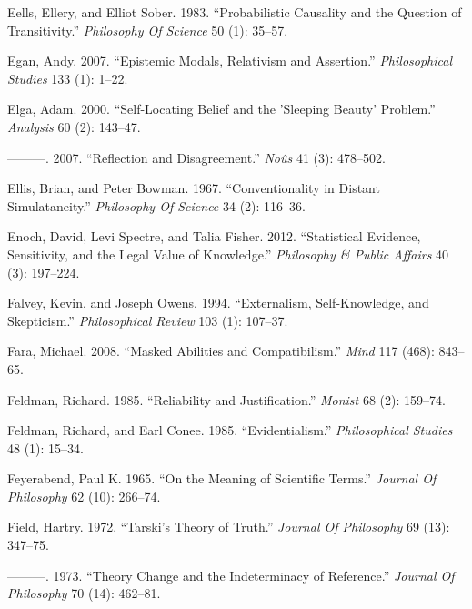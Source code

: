\documentclass[
  10pt,
  letterpaper,
  DIV=11,
  numbers=noendperiod,
  twoside]{scrartcl}
\newlength{\cslhangindent}
\newenvironment{CSLReferences}[2] %
 {\begin{list}{}{%
  \setlength{\itemindent}{0pt}
  \setlength{\leftmargin}{0pt}
  \setlength{\parsep}{0pt}
  \ifodd #1
   \setlength{\leftmargin}{\cslhangindent}
   \setlength{\itemindent}{-1\cslhangindent}
  \fi
  \setlength{\itemsep}{#2\baselineskip}}}
 {\end{list}}
\begin{document}
\begin{CSLReferences}{1}{0}
Eells, Ellery, and Elliot Sober. 1983. {``Probabilistic Causality and
the Question of Transitivity.''} \emph{Philosophy Of Science} 50 (1):
35--57.

Egan, Andy. 2007. {``Epistemic Modals, Relativism and Assertion.''}
\emph{Philosophical Studies} 133 (1): 1--22.

Elga, Adam. 2000. {``Self-Locating Belief and the 'Sleeping Beauty'
Problem.''} \emph{Analysis} 60 (2): 143--47.

---------. 2007. {``Reflection and Disagreement.''} \emph{Noûs} 41 (3):
478--502.

Ellis, Brian, and Peter Bowman. 1967. {``Conventionality in Distant
Simulataneity.''} \emph{Philosophy Of Science} 34 (2): 116--36.

Enoch, David, Levi Spectre, and Talia Fisher. 2012. {``Statistical
Evidence, Sensitivity, and the Legal Value of Knowledge.''}
\emph{Philosophy \& Public Affairs} 40 (3): 197--224.

Falvey, Kevin, and Joseph Owens. 1994. {``Externalism, Self-Knowledge,
and Skepticism.''} \emph{Philosophical Review} 103 (1): 107--37.

Fara, Michael. 2008. {``Masked Abilities and Compatibilism.''}
\emph{Mind} 117 (468): 843--65.

Feldman, Richard. 1985. {``Reliability and Justification.''}
\emph{Monist} 68 (2): 159--74.

Feldman, Richard, and Earl Conee. 1985. {``Evidentialism.''}
\emph{Philosophical Studies} 48 (1): 15--34.

Feyerabend, Paul K. 1965. {``On the Meaning of Scientific Terms.''}
\emph{Journal Of Philosophy} 62 (10): 266--74.

Field, Hartry. 1972. {``Tarski's Theory of Truth.''} \emph{Journal Of
Philosophy} 69 (13): 347--75.

---------. 1973. {``Theory Change and the Indeterminacy of Reference.''}
\emph{Journal Of Philosophy} 70 (14): 462--81.


\end{CSLReferences}
\end{document}
